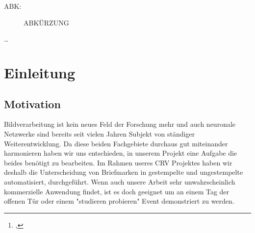 \documentclass[12pt,toc=bib,toc=listof]{scrreprt}
\title{\reprttopic}
\author{\reprtstudentname\footnote{\reprtstudentid, \reprtstudentmail}}
\begin{document}
\renewcommand*{\figurename}{Abb.}
\maketitle
{}

\tableofcontents

\label{sec:listofabbrv}

\label{sec:abkuerzungsverzeichnis}

\begin{description}
  \item[ABK:] ABKÜRZUNG 
\end{description}


\onehalfspacing

\label{cha:management_summary}
\ldots

\newpage
{}

\chapter{Einleitung} %
\label{sec:einleitung}

\section{Motivation} %
\label{sec:motivation}

Bildverarbeitung ist kein neues Feld der Forschung mehr und auch neuronale Netzwerke sind bereits seit vielen Jahren Subjekt von ständiger Weiterentwicklung. Da diese beiden Fachgebiete durchaus gut miteinander harmonieren haben wir uns entschieden, in unserem Projekt eine Aufgabe die beides benötigt zu bearbeiten. Im Rahmen useres CRV Projektes haben wir deshalb die Unterscheidung von Briefmarken in gestempelte und ungestempelte automatisiert, durchgeführt. Wenn auch unsere Arbeit sehr unwahrscheinlich kommerzielle Anwendung findet, ist es doch geeignet um an einem Tag der offenen Tür oder einem "studieren probieren" Event demonstriert zu werden.

\end{document}
